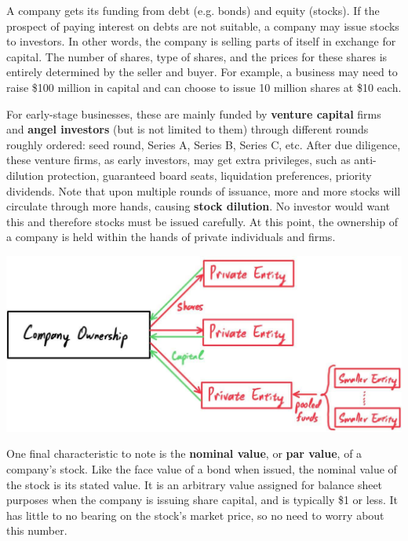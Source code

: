 \documentclass{article}
\begin{document}
    A company gets its funding from debt (e.g. bonds) and equity (stocks). If the prospect of paying interest on debts are not suitable, a company may issue stocks to investors. In other words, the company is selling parts of itself in exchange for capital. The number of shares, type of shares, and the prices for these shares is entirely determined by the seller and buyer. For example, a business may need to raise \$100 million in capital and can choose to issue 10 million shares at \$10 each.

    For early-stage businesses, these are mainly funded by \textbf{venture capital} firms and \textbf{angel investors} (but is not limited to them) through different rounds roughly ordered: seed round, Series A, Series B, Series C, etc. After due diligence, these venture firms, as early investors, may get extra privileges, such as anti-dilution protection, guaranteed board seats, liquidation preferences, priority dividends. Note that upon multiple rounds of issuance, more and more stocks will circulate through more hands, causing \textbf{stock dilution}. No investor would want this and therefore stocks must be issued carefully. At this point, the ownership of a company is held within the hands of private individuals and firms.
    \begin{center}
        \includegraphics[scale=0.25]{img/company_in_private_hands.jpg}
    \end{center}
    One final characteristic to note is the \textbf{nominal value}, or \textbf{par value}, of a company's stock. Like the face value of a bond when issued, the nominal value of the stock is its stated value. It is an arbitrary value assigned for balance sheet purposes when the company is issuing share capital, and is typically \$1 or less. It has little to no bearing on the stock's market price, so no need to worry about this number.
\end{document}
